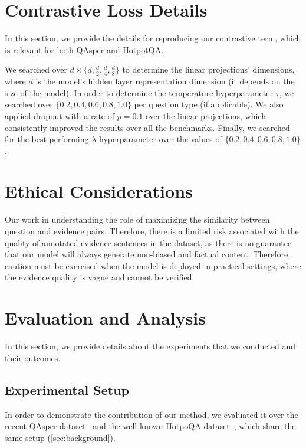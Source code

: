 \section{Contrastive Loss Details}
\label{sec:contrastive}
In this section, we provide the details for reproducing our contrastive term, which is relevant for both QAsper and HotpotQA.

We searched over $d\times\{d,\frac{d}{2},\frac{d}{4},\frac{d}{8}\}$ to determine the linear projections' dimensions, where $d$ is the model's hidden layer representation dimension (it depends on the size of the model). In order to determine the temperature hyperparameter $\tau$, we searched over $\{0.2,0.4,0.6,0.8,1.0\}$ per question type (if applicable). We also applied dropout with a rate of ${p=0.1}$ over the linear projections, which consistently improved the results over all the benchmarks. Finally, we searched for the best performing $\lambda$ hyperparameter over the values of $\{0.2,0.4,0.6,0.8,1.0\}$.


\section*{Ethical Considerations}
Our work in understanding the role of maximizing the similarity between question and evidence pairs. Therefore, there is a limited risk associated with the quality of annotated evidence sentences in the dataset, as there is no guarantee that our model will always
generate non-biased and factual content. Therefore, caution must
be exercised when the model is deployed in practical settings, where the evidence quality is vague and cannot be verified.




\section{Evaluation and Analysis}
In this section, we provide details about the experiments that we conducted and their outcomes. 
\subsection{Experimental Setup}


In order to demonstrate the contribution of our method, we evaluated it over the recent QAsper dataset~\cite{dasigi-etal-2021-dataset} and the well-known HotpoQA dataset~\cite{yang-etal-2018-hotpotqa},
which share the same setup (\sect \ref{sec:background}). 

